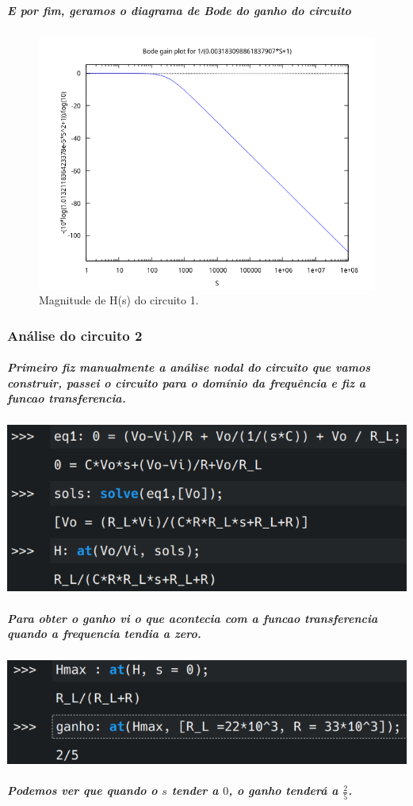 \documentclass[12pt,twoside, a4paper, twocolumn]{article}
\begin{document}
\subparagraph*{E por fim, geramos o diagrama de Bode do ganho do circuito}

\begin{figure}[h]
    \centering
    \includegraphics[width=1\columnwidth]{images/bodegain1.png}
    \caption{Magnitude de H(s) do circuito 1.}
\end{figure}


\subsubsection{Análise do circuito 2}



\subparagraph*{Primeiro fiz manualmente a análise nodal do circuito que vamos construir, passei o circuito para o domínio da frequência e fiz a funcao transferencia.}
\subparagraph*{}

\begin{adjustbox}{scale=0.4}
    \includegraphics{eqs2.png}
\end{adjustbox}


\subparagraph*{Para obter o ganho vi o que acontecia com a funcao transferencia quando a frequencia tendia a zero.}
\subparagraph*{}
\begin{adjustbox}{scale=0.4}
    \includegraphics{ganho2.png}
\end{adjustbox}
\subparagraph*{Podemos ver que quando o $s$ tender a $0$, o ganho tenderá a $\frac{2}{5}$.}
\end{document}
